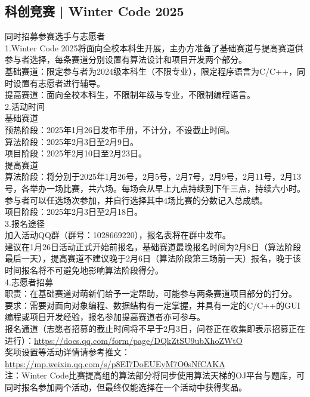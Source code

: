 \documentclass[letterpaper, 12pt]{article}
\begin{document}
\begin{multicols}{2}
\section{科创竞赛 | Winter Code 2025}
同时招募参赛选手与志愿者\\
1.Winter Code 2025将面向全校本科生开展，主办方准备了基础赛道与提高赛道供参与者选择，每条赛道分别设置有算法设计和项目开发两个部分。\\
基础赛道：限定参与者为2024级本科生（不限专业），限定程序语言为C/C++，同时设置有志愿者进行辅导。\\
提高赛道：面向全校本科生，不限制年级与专业，不限制编程语言。\\
2.活动时间\\
基础赛道\\
预热阶段：2025年1月26日发布手册，不计分，不设截止时间。\\
算法阶段：2025年2月3日至2月9日。\\
项目阶段：2025年2月10日至2月23日。\\
提高赛道\\
算法阶段：将分别于2025年1月26号，2月5号，2月7号，2月9号，2月11号，2月13号，各举办一场比赛，共六场。每场会从早上九点持续到下午三点，持续六小时。参与者可以任选场次参加，并自行选择其中4场比赛的分数记入总成绩。\\
项目阶段：2025年2月3日至2月18日。\\
3.报名途径\\
加入活动QQ群（群号：1028669220），报名表将在群中发布。\\
建议在1月26日活动正式开始前报名，基础赛道最晚报名时间为2月8日（算法阶段最后一天），提高赛道不建议晚于2月6日（算法阶段第三场前一天）报名，晚于该时间报名将不可避免地影响算法阶段得分。\\
4.志愿者招募\\
职责：在基础赛道对萌新们给予一定帮助，可能参与两条赛道项目部分的打分。\\
要求：需要对面向对象编程、数据结构有一定掌握，并具有一定的C/C++的GUI编程或项目开发经验，报名参加提高赛道者亦可参与。\\
报名通道（志愿者招募的截止时间将不早于2月3日，问卷正在收集即表示招募正在进行）：\url{https://docs.qq.com/form/page/DQkZtSU9ubXhoZWtO}\\
奖项设置等活动详情请参考推文：\url{https://mp.weixin.qq.com/s/p8EI7DoEUEyM7O0sNfCAKA}\\
注：Winter Code比赛提高组的算法部分将同步使用算法天梯的OJ平台与题库，可同时报名参加两个活动，但最终仅能选择在一个活动中获得奖品。\\

\end{multicols} 
\end{document}
